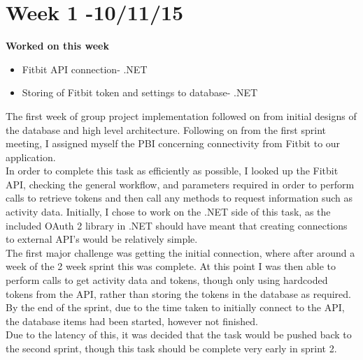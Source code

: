 \section{Week 1 -10/11/15}
\textbf{Worked on this week}
\begin{itemize}
\item Fitbit API connection- .NET
\item Storing of Fitbit token and settings to database- .NET
\end{itemize}
The first week of group project implementation followed on from initial designs of the database and high level architecture. Following on from the first sprint meeting, I assigned myself the PBI concerning connectivity from Fitbit to our application.\\
In order to complete this task as efficiently as possible, I looked up the Fitbit API, checking the general workflow, and parameters required in order to perform calls to retrieve tokens and then call any methods to request information such as activity data.
Initially, I chose to work on the .NET side of this task, as the included OAuth 2 library in .NET should have meant that creating connections to external API's would be relatively simple.\\
The first major challenge was getting the initial connection, where after around a week of the 2 week sprint this was complete.
At this point I was then able to perform calls to get activity data and tokens, though only using hardcoded tokens from the API, rather than storing the tokens in the database as required.\\
By the end of the sprint, due to the time taken to initially connect to the API, the database items had been started, however not finished.\\
Due to the latency of this, it was decided that the task would be pushed back to the second sprint, though this task should be complete very early in sprint 2.

